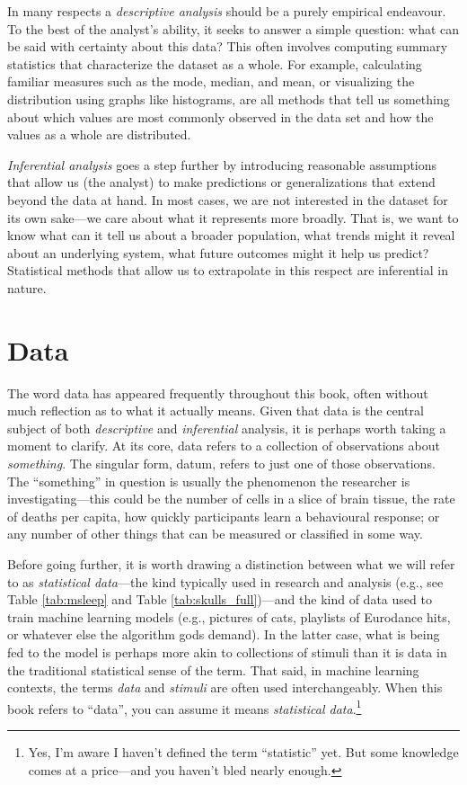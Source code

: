 In many respects a \textit{descriptive analysis} should be a purely empirical endeavour. To the best of the analyst’s ability, it seeks to answer a simple question: what can be said with certainty about this data? This often involves computing summary statistics that characterize the dataset as a whole. For example, calculating familiar measures such as the mode, median, and mean, or visualizing the distribution using graphs like histograms, are all methods that tell us something about which values are most commonly observed in the data set and how the values as a whole are distributed.

\textit{Inferential analysis} goes a step further by introducing reasonable assumptions that allow us (the analyst) to make predictions or generalizations that extend beyond the data at hand. In most cases, we are not interested in the dataset for its own sake—we care about what it represents more broadly. That is, we want to know what can it tell us about a broader population, what trends might it reveal about an underlying system, what future outcomes might it help us predict? Statistical methods that allow us to extrapolate in this respect are inferential in nature.

\section{Data}

The word data has appeared frequently throughout this book, often without much reflection as to what it actually means. Given that data is the central subject of both \textit{descriptive} and \textit{inferential} analysis, it is perhaps worth taking a moment to clarify. At its core, \gls{data} refers to a collection of observations about \textit{something}. The singular form, \gls{datum}, refers to just one of those observations. The ``something'' in question is usually the phenomenon the researcher is investigating—this could be the number of cells in a slice of brain tissue, the rate of deaths per capita, how quickly participants learn a behavioural response; or any number of other things that can be measured or classified in some way. 

Before going further, it is worth drawing a distinction between what we will refer to as \textit{statistical data}—the kind typically used in research and analysis (e.g., see Table \ref{tab:msleep} and Table \ref{tab:skulls_full})—and the kind of data used to train machine learning models (e.g., pictures of cats, playlists of Eurodance hits, or whatever else the algorithm gods demand). In the latter case, what is being fed to the model is perhaps more akin to collections of stimuli than it is data in the traditional statistical sense of the term. That said, in machine learning contexts, the terms \textit{data} and \textit{stimuli} are often used interchangeably. When this book refers to ``data'', you can assume it means \textit{statistical data}.\footnote{Yes, I’m aware I haven’t defined the term ``statistic'' yet. But some knowledge comes at a price—and you haven’t bled nearly enough.}

